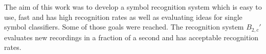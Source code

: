 \documentclass[9pt,technote]{IEEEtran}
\begin{document}
The aim of this work was to develop a symbol recognition system which is easy
to use, fast and has high recognition rates as well as evaluating ideas for
single symbol classifiers. Some of those goals were reached. The recognition
system $B_{2,c}'$ evaluates new recordings in a fraction of a second and has
acceptable recognition rates.




\end{document}
